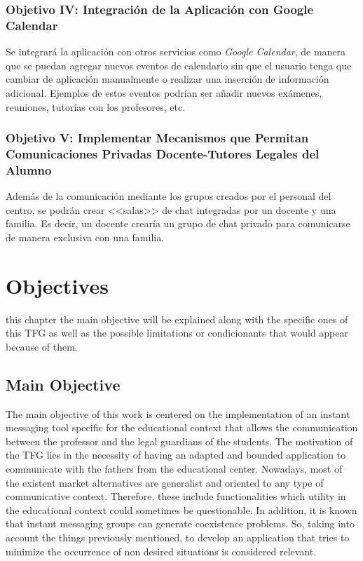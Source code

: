 \subsection{Objetivo IV: Integración de la Aplicación con Google Calendar}
Se integrará la aplicación con otros servicios como \textit{Google Calendar}, de manera que se puedan agregar nuevos eventos de calendario sin que el usuario tenga que cambiar de aplicación manualmente o realizar una inserción de información adicional. Ejemplos de estos eventos podrían ser añadir nuevos exámenes, reuniones, tutorías con los profesores, etc.

\subsection{Objetivo V: Implementar Mecanismos que Permitan Comunicaciones Privadas Docente-Tutores Legales del Alumno}
Además de la comunicación mediante los grupos creados por el personal del centro, se podrán crear <<salas>> de chat integradas por un docente y una familia. Es decir, un docente crearía un grupo de chat privado para comunicarse de manera exclusiva con una familia.

\chapter{Objectives}
 this chapter the main objective will be explained along with the specific ones of this \acs{TFG} as well as the possible limitations or condicionants that would appear because of them.

\section{Main Objective}
The main objective of this work is centered on the implementation of an instant messaging tool specific for the educational context that allows the communication between the \mbox{professor} and the legal guardians of the students. The motivation of the \acs{TFG} lies in the \mbox{necessity} of having an adapted and bounded application to communicate with the fathers from the \mbox{educational} center. Nowadays, most of the existent market alternatives are \mbox{generalist} and oriented to any type of communicative context. Therefore, these include functionalities which utility in the educational context could sometimes be questionable. In addition, it is known that \mbox{instant} messaging groups can generate coexistence problems. So, taking into \mbox{account} the things \mbox{previously} mentioned, to develop an application that tries to minimize the occurrence of non desired situations is considered relevant.

